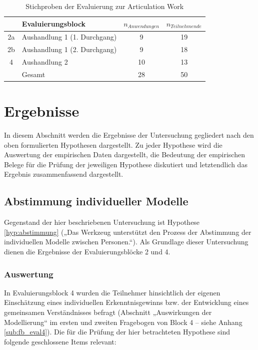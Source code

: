 \begin{table}[htbp]
	\centering
	\caption{Stichproben der Evaluierung zur Articulation Work}

		\begin{tabular}{| c | l || c | c |}
		\hline
			& Evaluierungsblock & $n_{Anwendungen}$ & $n_{Teilnehmende}$ \\ \hline
			2a & Aushandlung 1 (1. Durchgang)  &  9 & 19 \\
			2b & Aushandlung 1 (2. Durchgang)  &  9 & 18 \\
			4 & Aushandlung 2				  & 10 & 13 \\ \hline
			& Gesamt						  & 28 & 50 \\ \hline
	\end{tabular}
	\label{tab:stichprobe_aw}
\end{table}


\section{Ergebnisse} %
\label{sec:a_ergebnisse}

In diesem Abschnitt werden die Ergebnisse der Untersuchung gegliedert nach den oben formulierten Hypothesen dargestellt. Zu jeder Hypothese wird die Auswertung der empirischen Daten dargestellt, die Bedeutung der empirischen Belege für die Prüfung der jeweiligen Hypothese diskutiert und letztendlich das Ergebnis zusammenfassend dargestellt.  

\subsection{Abstimmung individueller Modelle} %
\label{sub:abstimmung_individueller_modelle}

Gegenstand der hier beschriebenen Untersuchung ist Hypothese \ref{hyp:abstimmung} („Das Werkzeug unterstützt den Prozess der Abstimmung der individuellen Modelle zwischen Personen.“). Als Grundlage dieser Untersuchung dienen die Ergebnisse der Evaluierungsblöcke 2 und 4.

\subsubsection{Auswertung} 

In Evaluierungsblock 4 wurden die Teilnehmer hinsichtlich der eigenen Einschätzung eines individuellen Erkenntnisgewinns bzw. der Entwicklung eines gemeinsamen Verständnisses befragt (Abschnitt „Auswirkungen der Modellierung“ im ersten und zweiten Fragebogen von Block 4  -- siehe Anhang \ref{sub:fb_eval4}). Die für die Prüfung der hier betrachteten Hypothese sind folgende geschlossene Items relevant:

